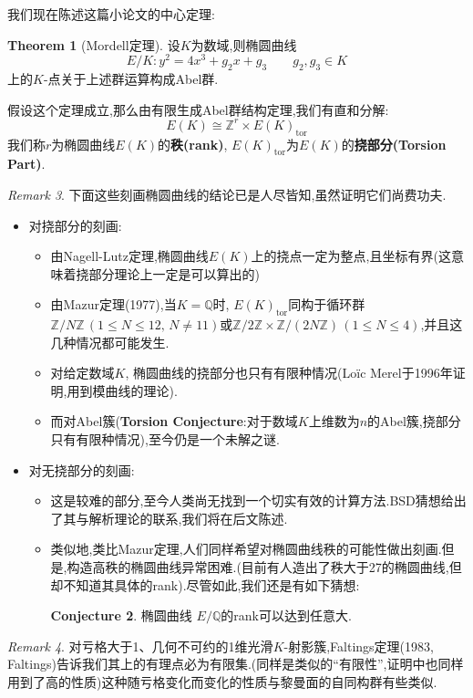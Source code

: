 \documentclass[12pt,A4paper,oneside,reqno]{amsart}
\numberwithin{equation}{section}
\theoremstyle{definition}
\newtheorem{theorem}{Theorem}[section]
\newtheorem{conj}[theorem]{Conjecture}
\theoremstyle{plain}
\theoremstyle{plain}
\numberwithin{equation}{section}
\theoremstyle{remark}
\newtheorem{remark}[theorem]{Remark}
\DeclareMathOperator{\tor}{\operatorname{tor}}
\begin{document}
我们现在陈述这篇小论文的中心定理:
\begin{theorem}[Mordell定理]
	设$K$为数域,则椭圆曲线$$E/K:y^2=4x^3+g_2x+g_3 \qquad g_2,g_3 \in K$$
	上的$K$-点关于上述群运算构成Abel群.
\end{theorem}
假设这个定理成立,那么由有限生成Abel群结构定理,我们有直和分解:
$$E(K) \cong \mathbb{Z}^{r} \times E(K)_{\tor}$$
我们称$r$为椭圆曲线$E(K)$的\textbf{秩(rank)}, $E(K)_{\tor}$为$E(K)$的\textbf{挠部分(Torsion Part)}.
\begin{remark}
	下面这些刻画椭圆曲线的结论已是人尽皆知,虽然证明它们尚费功夫.
	\begin{itemize}
		\item 对挠部分的刻画:
		\begin{itemize}
			\item 由Nagell-Lutz定理,椭圆曲线$E(K)$上的挠点一定为整点,且坐标有界(这意味着挠部分理论上一定是可以算出的)
			\item 由Mazur定理(1977),当$K=\mathbb{Q}$时, $E(K)_{\tor}$同构于循环群$\mathbb{Z}/N\mathbb{Z}\,(1 \leqslant N \leqslant 12,\, N \neq 11)$或$\mathbb{Z}/2\mathbb{Z} \times \mathbb{Z}/(2N\mathbb{Z}) \,(1 \leqslant N \leqslant 4)$,并且这几种情况都可能发生.
			\item []对给定数域$K$, 椭圆曲线的挠部分也只有有限种情况(Lo\"{i}c Merel于1996年证明,用到模曲线的理论).
			\item []而对Abel簇(\textbf{Torsion Conjecture}:对于数域$K$上维数为$n$的Abel簇,挠部分只有有限种情况),至今仍是一个未解之谜.
		\end{itemize}
	\item 对无挠部分的刻画:
	\begin{itemize}
		\item 这是较难的部分,至今人类尚无找到一个切实有效的计算方法.BSD猜想给出了其与解析理论的联系,我们将在后文陈述.
		\item 类似地,类比Mazur定理,人们同样希望对椭圆曲线秩的可能性做出刻画.但是,构造高秩的椭圆曲线异常困难.(目前有人造出了秩大于27的椭圆曲线,但却不知道其具体的rank).尽管如此,我们还是有如下猜想:
		\begin{conj}
			椭圆曲线 $E/\mathbb{Q}$的rank可以达到任意大.
		\end{conj}
	\end{itemize}
	\end{itemize}
\end{remark}
\begin{remark}
	对亏格大于1、几何不可约的1维光滑$K$-射影簇,Faltings定理(1983, Faltings)告诉我们其上的有理点必为有限集.(同样是类似的“有限性”,证明中也同样用到了高的性质)这种随亏格变化而变化的性质与黎曼面的自同构群有些类似.
\end{remark}
\end{document}
